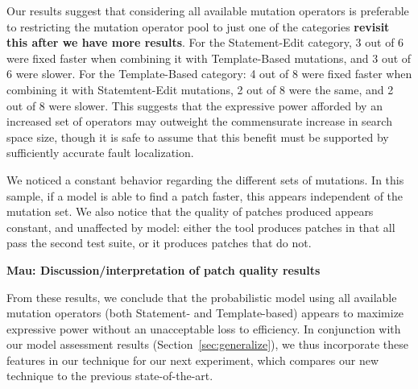 \documentclass[conference]{IEEEtran}
\newcommand{\todo}[1]
  {{\scriptsize \textbf{\color{red} {#1}}}}
\begin{document}
Our results suggest that considering all available mutation operators is
preferable to 
restricting the mutation operator pool to just one of the categories \todo{revisit this after we have more results}. For the
Statement-Edit category, 3 out of 6 were fixed faster when combining it with
Template-Based mutations, and 3 out of 6 were slower. For the Template-Based
category: 4 out of 8 were fixed faster when combining it with Statemtent-Edit
mutations, 2 out of 8 were the same, and 2 out of 8 were slower. This suggests
that the expressive power afforded by an increased set of operators may
outweight the commensurate increase in search space size, though it is safe to
assume that this benefit must be supported by sufficiently accurate fault
localization. 

We noticed a
constant behavior regarding the different sets of mutations. In this sample, if
a model is able to find a patch faster, this appears independent of the mutation
set.  We also notice that
the quality of patches produced  appears constant, and unaffected by model:
either the tool produces patches in 
that all pass the second test suite, or it produces patches that do not. 

\todo{Mau: Discussion/interpretation of patch quality results}

From these results, we conclude that the probabilistic model using all available
mutation operators (both Statement- and Template-based) appears to maximize
expressive power without an unacceptable loss to efficiency.  In conjunction
with our model assessment results (Section~\ref{sec:generalize}), we thus
incorporate these features in our technique for our next experiment, which
compares our new technique to the previous state-of-the-art.


\end{document}
